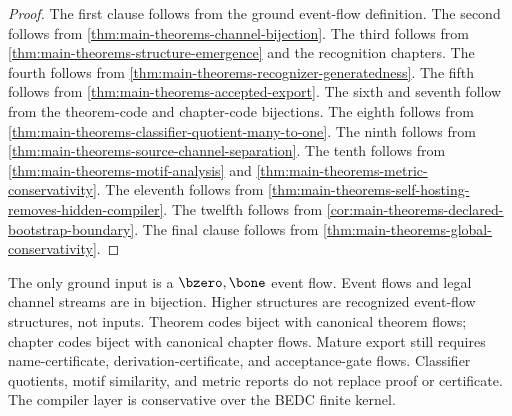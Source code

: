 \begin{proof}
The first clause follows from the ground event-flow definition. The second follows from \autoref{thm:main-theorems-channel-bijection}. The third follows from \autoref{thm:main-theorems-structure-emergence} and the recognition chapters. The fourth follows from \autoref{thm:main-theorems-recognizer-generatedness}. The fifth follows from \autoref{thm:main-theorems-accepted-export}. The sixth and seventh follow from the theorem-code and chapter-code bijections. The eighth follows from \autoref{thm:main-theorems-classifier-quotient-many-to-one}. The ninth follows from \autoref{thm:main-theorems-source-channel-separation}. The tenth follows from \autoref{thm:main-theorems-motif-analysis} and \autoref{thm:main-theorems-metric-conservativity}. The eleventh follows from \autoref{thm:main-theorems-self-hosting-removes-hidden-compiler}. The twelfth follows from \autoref{cor:main-theorems-declared-bootstrap-boundary}. The final clause follows from \autoref{thm:main-theorems-global-conservativity}.
\end{proof}

\begin{remark}[Summary]
\label{rem:main-theorems-summary}
The only ground input is a $\bzero,\bone$ event flow. Event flows and legal channel streams are in bijection. Higher structures are recognized event-flow structures, not inputs. Theorem codes biject with canonical theorem flows; chapter codes biject with canonical chapter flows. Mature export still requires name-certificate, derivation-certificate, and acceptance-gate flows. Classifier quotients, motif similarity, and metric reports do not replace proof or certificate. The compiler layer is conservative over the BEDC finite kernel.
\end{remark}
